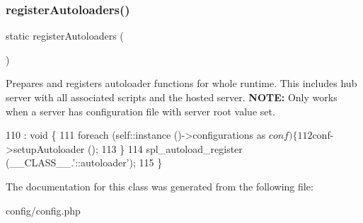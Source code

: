 \subsubsection{\texorpdfstring{register\+Autoloaders()}{registerAutoloaders()}}
{\footnotesize\ttfamily static register\+Autoloaders (\begin{DoxyParamCaption}{ }\end{DoxyParamCaption})\hspace{0.3cm}{\ttfamily [static]}}

Prepares and registers autoloader functions for whole runtime. This includes hub server with all associated scripts and the hosted server. {\bfseries N\+O\+TE\+:} Only works when a server has configuration file with server root value set. 
\begin{DoxyCode}
110                                                   : \textcolor{keywordtype}{void} \{
111         \textcolor{keywordflow}{foreach} (self::instance ()->configurations as $conf) \{
112             $conf->setupAutoloader ();
113         \}
114         spl\_autoload\_register (\_\_CLASS\_\_.\textcolor{stringliteral}{'::autoloader'});
115     \}
\end{DoxyCode}


The documentation for this class was generated from the following file\+:\begin{DoxyCompactItemize}
\item 
config/config.\+php\end{DoxyCompactItemize}
